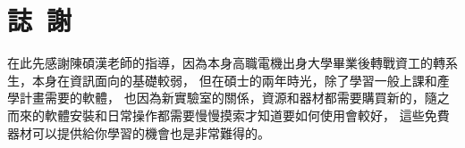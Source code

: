 \chapter*{誌~謝~}

\indent %
 在此先感謝陳碩漢老師的指導，因為本身高職電機出身大學畢業後轉戰資工的轉系生，本身在資訊面向的基礎較弱，
 但在碩士的兩年時光，除了學習一般上課和產學計畫需要的軟體，
 也因為新實驗室的關係，資源和器材都需要購買新的，隨之而來的軟體安裝和日常操作都需要慢慢摸索才知道要如何使用會較好，
 這些免費器材可以提供給你學習的機會也是非常難得的。